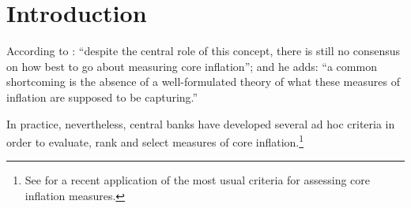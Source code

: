 \section{Introduction}


According to \textcite[p.~205]{wynne2008core}: ``despite the central role of this concept, there is still no consensus on how best to go about measuring core inflation''; and he adds: ``a common shortcoming is the absence of a well-formulated theory of what these measures of inflation are supposed to be capturing.''

In practice, nevertheless, central banks have developed several ad hoc criteria in order to evaluate, rank and select measures of core inflation.\footnote{See \textcite[p.~9-10]{bankofcanada2021renewal} for a recent application of the most usual criteria for assessing core inflation measures.}